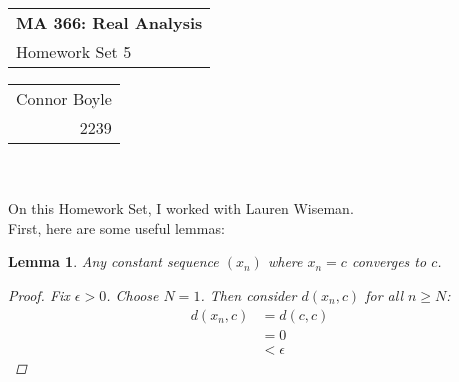 \documentclass{amsart}
\def\name{Connor Boyle} %
\def\CM{2239} %
\def\hwnum{5} %
\newtheorem{lemma}[theorem]{Lemma}
\begin{document}
\noindent
\thispagestyle{firststyle}
\begin{tabular}{l}
{\LARGE \textbf{MA 366: Real Analysis} }\\
{\Large Homework Set \hwnum}
\end{tabular} \hfill \begin{tabular}{r}
                        \name \\
                        \CM
                        \end{tabular}

\noindent \hrulefill \\\\
On this Homework Set, I worked with Lauren Wiseman.\\
First, here are some useful lemmas:
\begin{lemma}
    Any constant sequence $(x_n)$ where $x_n = c$ converges to $c$.
    \begin{proof}
        Fix $\epsilon > 0$. Choose $N = 1$. Then consider $d(x_n, c)$ for all $n \geq N$:
        \begin{align*}
            d(x_n, c) &= d(c, c) \\
            &= 0 \\
            &< \epsilon
        \end{align*}
    \end{proof}
\end{lemma}
\end{document}
